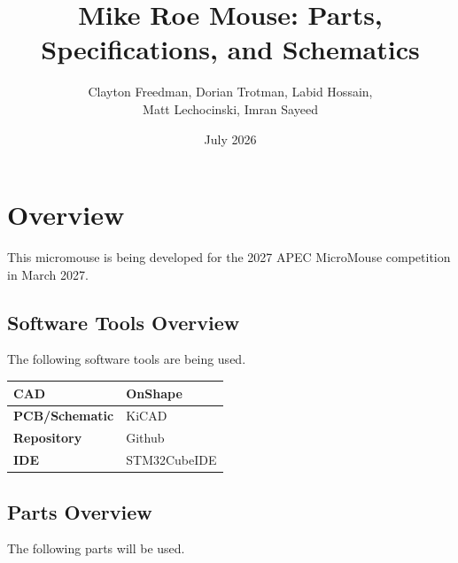 \documentclass[10pt, letterpaper]{article}
\title{Mike Roe Mouse: Parts, Specifications, and Schematics}
\author{Clayton Freedman, Dorian Trotman, Labid Hossain, \\
        Matt Lechocinski, Imran Sayeed}
\date{July 2026}
\begin{document}
\maketitle
\tableofcontents

\section{Overview}

    \begin{flushleft}
    This micromouse is being developed for the 2027 APEC MicroMouse competition in March 2027. \\
    \end{flushleft}

    \subsection{Software Tools Overview}

        \begin{flushleft}
        The following software tools are being used.
        \end{flushleft}

        \begin{center}
        \begin{tabular}{ll}

            \toprule
            \textbf{CAD} & OnShape \\
            \midrule
            \textbf{PCB/Schematic} & KiCAD \\
            \midrule
            \textbf{Repository} & Github \\
            \midrule
            \textbf{IDE} & STM32CubeIDE \\
            \bottomrule
    
        \end{tabular}
        \end{center}

    \subsection{Parts Overview}

        \begin{flushleft}
        The following parts will be used.\\
        \end{flushleft}
\end{document}
